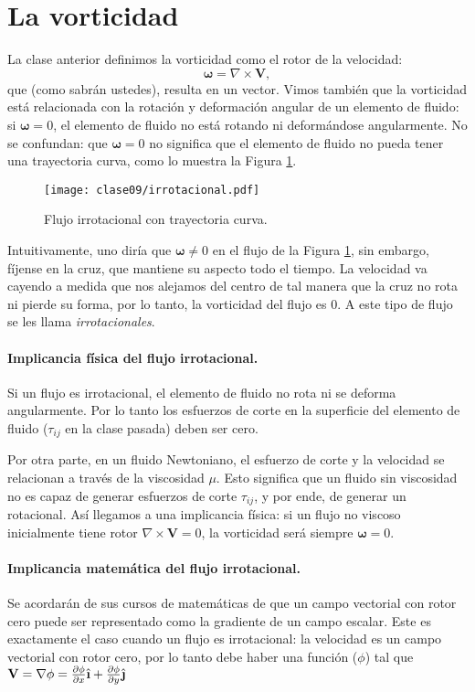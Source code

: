 \section*{La vorticidad}
La clase anterior definimos la vorticidad como el rotor de la velocidad:
%
\begin{equation}\label{eq:vort_2}
\boldsymbol{\omega} = \nabla\times\mathbf{V},
\end{equation}
%
que (como sabrán ustedes), resulta en un vector.
Vimos también que la vorticidad está relacionada con la rotación y deformación angular de un elemento de fluido: si $\boldsymbol{\omega}=0$, el elemento de fluido no está rotando ni deformándose angularmente.
No se confundan: que $\boldsymbol{\omega}=0$ no significa que el elemento de fluido no pueda tener una trayectoria curva, como lo muestra la Figura \ref{fig:irrotacional}.
%
\begin{figure}[!h]
\centering
\texttt{[image: clase09/irrotacional.pdf]}
\caption{Flujo irrotacional con trayectoria curva.}
\label{fig:irrotacional}
\end{figure}
%
Intuitivamente, uno diría que $\boldsymbol{\omega}\neq 0$ en el flujo de la Figura \ref{fig:irrotacional}, sin embargo, fíjense en la cruz, que mantiene su aspecto todo el tiempo. 
La velocidad va cayendo a medida que nos alejamos del centro de tal manera que la cruz no rota ni pierde su forma, por lo tanto, la vorticidad del flujo es $0$.
A este tipo de flujo se les llama \emph{irrotacionales}.

\paragraph*{Implicancia física del flujo irrotacional.}
Si un flujo es irrotacional, el elemento de fluido no rota ni se deforma angularmente. 
Por lo tanto los esfuerzos de corte en la superficie del elemento de fluido ($\tau_{ij}$ en la clase pasada) deben ser cero.

Por otra parte, en un fluido Newtoniano, el esfuerzo de corte y la velocidad se relacionan a través de la viscosidad $\mu$.
Esto significa que un fluido sin viscosidad no es capaz de generar esfuerzos de corte $\tau_{ij}$, y por ende, de generar un rotacional.
Así llegamos a una implicancia física: si un flujo no viscoso inicialmente tiene rotor $\nabla\times\mathbf{V}=0$, la vorticidad será siempre $\boldsymbol{\omega}=0$.

\paragraph*{Implicancia matemática del flujo irrotacional.}
Se acordarán de sus cursos de matemáticas de que un campo vectorial con rotor cero puede ser representado como la gradiente de un campo escalar.
Este es exactamente el caso cuando un flujo es irrotacional: la velocidad es un campo vectorial con rotor cero, por lo tanto debe haber una función ($\phi$) tal que $\mathbf{V} = \nabla\phi = \frac{\partial \phi}{\partial x}\ihat + \frac{\partial \phi}{\partial y}\jhat$

